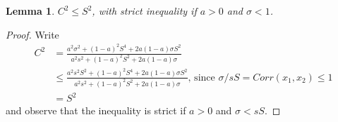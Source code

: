 \documentclass[
  12pt,
]{article}
\newtheorem{lemma}{Lemma}
\theoremstyle{definition}
\theoremstyle{definition}
\theoremstyle{definition}
\theoremstyle{definition}
\theoremstyle{remark}
\begin{document}
\begin{lemma}\label{C2}
 $C^2 \le S^2$, with strict inequality if $a > 0$ and $\sigma < 1$.

\end{lemma}
\begin{proof}
Write
\begin{align*}
C^{2}   &= \frac{
            a^{2}\sigma^{2}+(1-a)^{2}S^{4}+2a(1-a)\sigma S^{2}
         }{
           a^{2}s^{2}+(1-a)^{2}S^{2}+2a(1-a)\sigma
         } \\
    &\le \frac{
        a^{2}s^{2}S^{2}+(1-a)^{2}S^{4}+2a(1-a)\sigma S^{2}
      }{
        a^{2}s^{2}+(1-a)^{2}S^{2}+2a(1-a)\sigma
      }
      \textrm{, since }\sigma/sS = Corr(x_1,x_2) \le 1 \\
    &= S^{2}
\end{align*}
and observe that the inequality is strict if $a > 0$ and $\sigma < sS$.
\end{proof}
\end{document}
